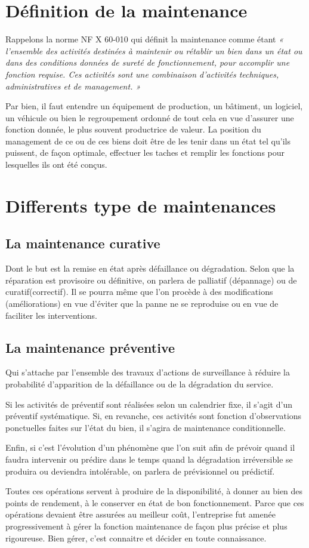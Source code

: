 
\section{Définition de la maintenance}
Rappelons la norme NF X 60-010 qui définit la maintenance comme étant 
\textit{« l’ensemble des activités destinées à maintenir ou rétablir un bien dans un état ou dans 
des conditions données de sureté de fonctionnement, pour accomplir une fonction requise. 
Ces activités sont une combinaison d’activités techniques, administratives et de management. »}\cite{def_maintenance}

Par bien, il faut entendre un équipement de production, un bâtiment, un logiciel, un véhicule 
ou bien le regroupement ordonné de tout cela en vue d’assurer une fonction donnée, 
le plus souvent productrice de valeur. La position du management de ce ou de ces biens 
doit être de les tenir dans un état tel qu’ils puissent, de façon optimale, effectuer les 
taches et remplir les fonctions pour lesquelles ils ont été conçus.

\section{Differents type de maintenances }
\subsection{La maintenance curative}
Dont le but est la remise en état après défaillance ou dégradation. 
Selon que la réparation est provisoire ou définitive, on parlera de palliatif (dépannage) 
ou de curatif(correctif). Il se pourra même que l’on procède à des modifications 
(améliorations) en vue d’éviter que la panne ne se reproduise ou en vue de faciliter 
les interventions.
\pagebreak
\subsection{La maintenance préventive}
Qui s’attache par l’ensemble des travaux d’actions de surveillance à réduire la probabilité 
d’apparition de la défaillance ou de la dégradation du service.

Si les activités de préventif sont réalisées selon un calendrier fixe, il s’agit d’un préventif 
systématique. Si, en revanche, ces activités sont fonction d’observations ponctuelles faites sur l’état du bien, 
il s’agira de maintenance conditionnelle.

Enfin, si c’est l’évolution d’un phénomène que l’on suit afin de prévoir quand il faudra intervenir ou prédire dans le temps 
quand la dégradation irréversible se produira ou deviendra intolérable, on parlera de prévisionnel ou prédictif.

Toutes ces opérations servent à produire de la disponibilité, à donner au bien des points de rendement, à le conserver
 en état de bon fonctionnement. Parce que ces opérations devaient être assurées au meilleur coût, l’entreprise fut amenée 
 progressivement à gérer la fonction maintenance de façon plus précise et plus rigoureuse. Bien gérer, c’est connaitre et 
 décider en toute connaissance.

